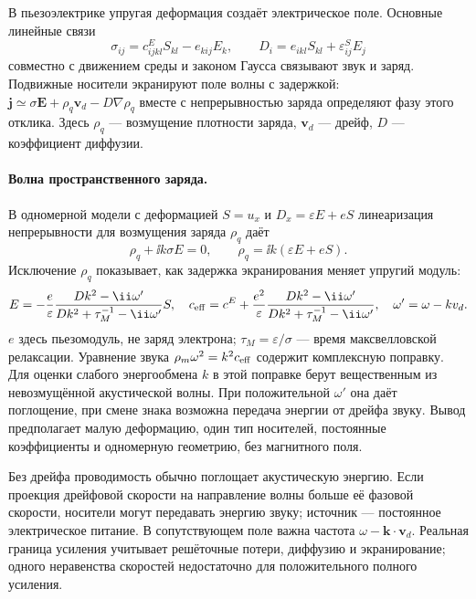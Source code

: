 
В пьезоэлектрике упругая деформация создаёт электрическое поле. Основные линейные связи
\begin{equation}
 \sigma_{ij}=c^E_{ijkl}S_{kl}-e_{kij}E_k,\qquad
 D_i=e_{ikl}S_{kl}+\varepsilon^S_{ij}E_j
\end{equation}
совместно с движением среды и законом Гаусса связывают звук и заряд. Подвижные носители экранируют поле волны с задержкой: $\bm j\simeq\sigma\bm E+\rho_q\bm v_d-D\nabla\rho_q$ вместе с непрерывностью заряда определяют фазу этого отклика. Здесь $\rho_q$ — возмущение плотности заряда, $\bm v_d$ — дрейф, $D$ — коэффициент диффузии.


\paragraph{Волна пространственного заряда.}
В одномерной модели с деформацией $S=u_x$ и $D_x=\varepsilon E+eS$ линеаризация непрерывности для возмущения заряда $\rho_q$ даёт
\begin{equation}
 [-\ii(\omega-kv_d)+Dk^2]\rho_q+\ii k\sigma E=0,\qquad
 \rho_q=\ii k(\varepsilon E+eS).
\end{equation}
Исключение $\rho_q$ показывает, как задержка экранирования меняет упругий модуль:
\begin{equation}\label{eq:spacechargeacoustic}
 E=-\frac e\varepsilon\frac{Dk^2-\ii\omega'}{Dk^2+\tau_M^{-1}-\ii\omega'}S,
 \quad c_{\rm eff}=c^E+\frac{e^2}{\varepsilon}
 \frac{Dk^2-\ii\omega'}{Dk^2+\tau_M^{-1}-\ii\omega'},
 \quad\omega'=\omega-kv_d.
\end{equation}
$e$ здесь пьезомодуль, не заряд электрона; $\tau_M=\varepsilon/\sigma$ --- время максвелловской релаксации. Уравнение звука $\rho_m\omega^2=k^2c_{\rm eff}$ содержит комплексную поправку. Для оценки слабого энергообмена $k$ в этой поправке берут вещественным из невозмущённой акустической волны. При положительной $\omega'$ она даёт поглощение, при смене знака возможна передача энергии от дрейфа звуку. Вывод предполагает малую деформацию, один тип носителей, постоянные коэффициенты и одномерную геометрию, без магнитного поля.

Без дрейфа проводимость обычно поглощает акустическую энергию. Если проекция дрейфовой скорости на направление волны больше её фазовой скорости, носители могут передавать энергию звуку; источник — постоянное электрическое питание. В сопутствующем поле важна частота $\omega-\bm k\cdot\bm v_d$. Реальная граница усиления учитывает решёточные потери, диффузию и экранирование; одного неравенства скоростей недостаточно для положительного полного усиления.


